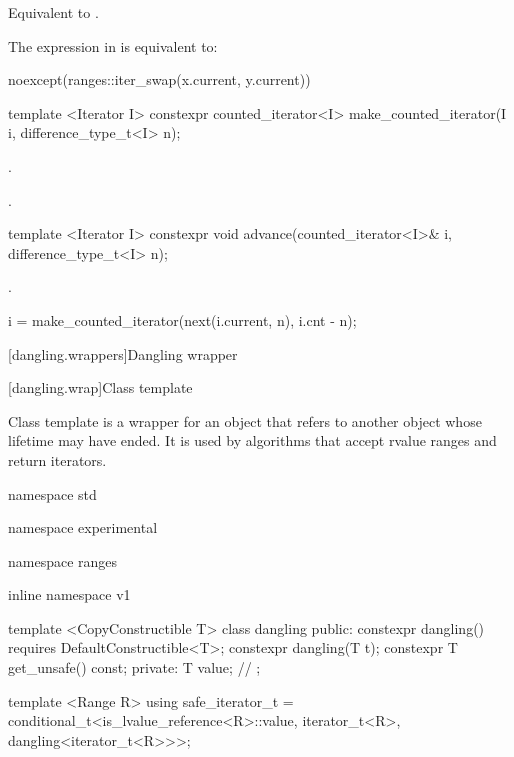 \begin{itemdescr}
\pnum
\effects Equivalent to .

\pnum
\remarks The expression in  is equivalent to:
\begin{codeblock}
noexcept(ranges::iter_swap(x.current, y.current))
\end{codeblock}
\end{itemdescr}

%
\begin{itemdecl}
template <Iterator I>
  constexpr counted_iterator<I> make_counted_iterator(I i, difference_type_t<I> n);
\end{itemdecl}

\begin{itemdescr}
\pnum
\requires {}.

\pnum
\returns {}.
\end{itemdescr}

%
\begin{itemdecl}
template <Iterator I>
  constexpr void advance(counted_iterator<I>& i, difference_type_t<I> n);
\end{itemdecl}

\begin{itemdescr}
\pnum
\requires {}.

\pnum
\effects
\begin{codeblock}
i = make_counted_iterator(next(i.current, n), i.cnt - n);
\end{codeblock}
\end{itemdescr}

[dangling.wrappers]{Dangling wrapper}

[dangling.wrap]{Class template }

\pnum
{}%
Class template  is a wrapper for an object that refers to another object whose
lifetime may have ended. It is used by algorithms that accept rvalue ranges and return iterators.

\begin{codeblock}
namespace std { namespace experimental { namespace ranges { inline namespace v1 {
  template <CopyConstructible T>
  class dangling {
  public:
    constexpr dangling() requires DefaultConstructible<T>;
    constexpr dangling(T t);
    constexpr T get_unsafe() const;
  private:
    T value; // \expos
  };

  template <Range R>
  using safe_iterator_t =
    conditional_t<is_lvalue_reference<R>::value,
      iterator_t<R>,
      dangling<iterator_t<R>>>;
}}}}
\end{codeblock}

